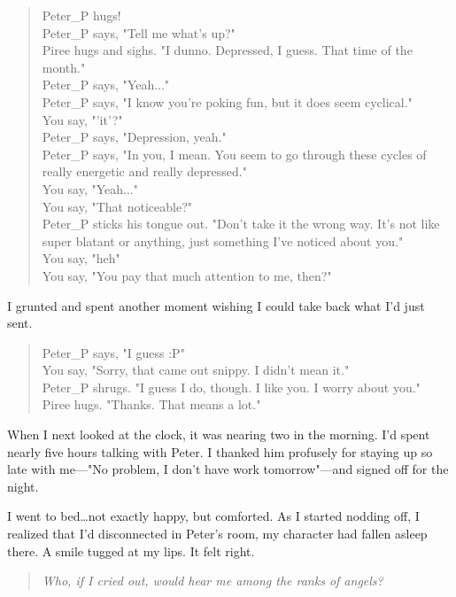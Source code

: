\begin{verse}
    {\MUCKFamily
Peter\_P hugs!\\
Peter\_P says, "Tell me what's up?"\\
Piree hugs and sighs. "I dunno. Depressed, I guess. That time of the month."\\
Peter\_P says, "Yeah..."\\
Peter\_P says, "I know you're poking fun, but it does seem cyclical."\\
You say, "'it'?"\\
Peter\_P says, "Depression, yeah."\\
Peter\_P says, "In you, I mean. You seem to go through these cycles of really energetic and really depressed."\\
You say, "Yeah..."\\
You say, "That noticeable?"\\
Peter\_P sticks his tongue out. "Don't take it the wrong way. It's not like super blatant or anything, just something I've noticed about you."\\
You say, "heh"\\
You say, "You pay that much attention to me, then?"}
\end{verse}

I grunted and spent another moment wishing I could take back what I'd just sent.

\begin{verse}
    {\MUCKFamily
Peter\_P says, "I guess :P"\\
You say, "Sorry, that came out snippy. I didn't mean it."\\
Peter\_P shrugs. "I guess I do, though. I like you. I worry about you."\\
Piree hugs. "Thanks. That means a lot."}
\end{verse}

When I next looked at the clock, it was nearing two in the morning. I'd spent nearly five hours talking with Peter. I thanked him profusely for staying up so late with me---{\MUCKFamily "No problem, I don't have work tomorrow"}---and signed off for the night.

I went to bed\ldots{}not exactly happy, but comforted. As I started nodding off, I realized that I'd disconnected in Peter's room, my character had fallen asleep there. A smile tugged at my lips. It felt right.

\secdiv{}

\noindent \begin{verse}
\emph{Who, if I cried out, would hear me among the ranks of angels?}
\end{verse}

